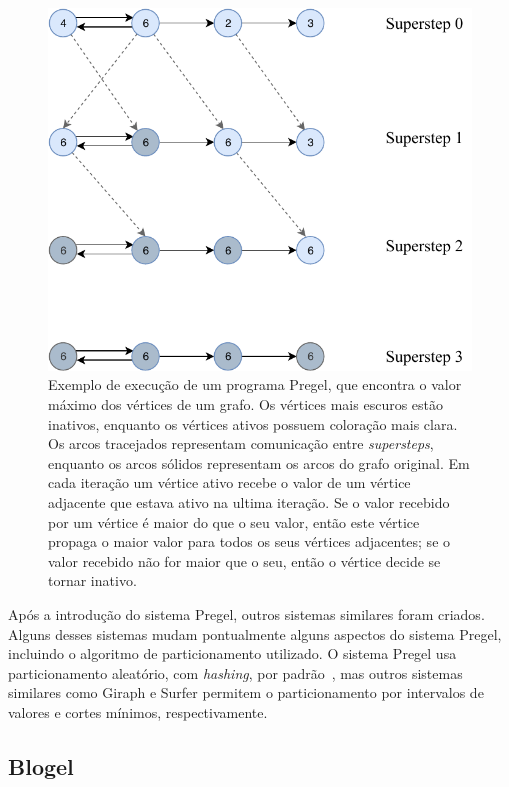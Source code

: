 \documentclass[conference]{IEEEtran}
\begin{document}
\begin{figure}
    \begin{center}
        \includegraphics[width=.45\textwidth,
        clip]{pregel/execution_example.pdf}
    \end{center}
    \caption{Exemplo de execução de um programa Pregel, que encontra o
    valor máximo dos vértices de um grafo. Os vértices mais escuros
    estão inativos, enquanto os vértices ativos possuem coloração mais
    clara. Os arcos tracejados representam comunicação entre {\em
    supersteps}, enquanto os arcos sólidos representam os arcos do grafo
    original. Em cada iteração um vértice ativo recebe o valor de um
    vértice adjacente que estava ativo na ultima iteração. Se o valor
    recebido por um vértice é maior do que o seu valor, então este
    vértice propaga o maior valor para todos os seus vértices
    adjacentes; se o valor recebido não for maior que o seu, então o
    vértice decide se tornar inativo.
    }
    \label{fig:execution_example}
\end{figure}

%
%
Após a introdução do sistema Pregel, outros sistemas similares foram
criados. Alguns desses sistemas mudam pontualmente alguns aspectos do
sistema Pregel, incluindo o algoritmo de particionamento utilizado.
O sistema Pregel usa particionamento aleatório, com {\em hashing}, por
padrão~\cite{pregel}, mas outros sistemas similares como Giraph e Surfer
permitem o particionamento por intervalos de valores e cortes mínimos,
respectivamente.

\subsection{Blogel}
\end{document}
